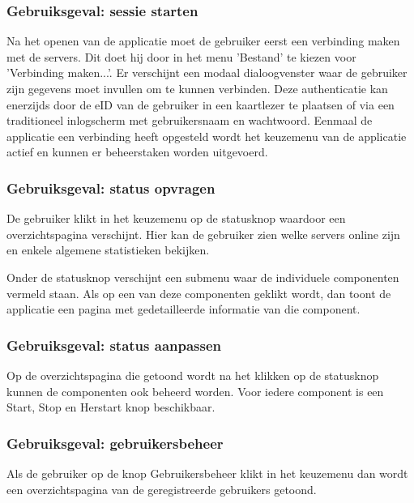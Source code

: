\subsubsection{Gebruiksgeval: sessie starten}
Na het openen van de applicatie moet de gebruiker eerst een verbinding maken met de servers. Dit doet hij door in het menu 'Bestand' te kiezen voor 'Verbinding maken...'. Er verschijnt een modaal dialoogvenster waar de gebruiker zijn gegevens moet invullen om te kunnen verbinden. Deze authenticatie kan enerzijds door de eID van de gebruiker in een kaartlezer te plaatsen of via een traditioneel inlogscherm met gebruikersnaam en wachtwoord. Eenmaal de applicatie een verbinding heeft opgesteld wordt het keuzemenu van de applicatie actief en kunnen er beheerstaken worden uitgevoerd.

\subsubsection{Gebruiksgeval: status opvragen}
De gebruiker klikt in het keuzemenu op de statusknop waardoor een overzichtspagina verschijnt. Hier kan de gebruiker zien welke servers online zijn en enkele algemene statistieken bekijken.

Onder de statusknop verschijnt een submenu waar de individuele componenten vermeld staan. Als op een van deze componenten geklikt wordt, dan toont de applicatie een pagina met gedetailleerde informatie van die component.

\subsubsection{Gebruiksgeval: status aanpassen}
Op de overzichtspagina die getoond wordt na het klikken op de statusknop kunnen de componenten ook beheerd worden. Voor iedere component is een Start, Stop en Herstart knop beschikbaar.

\subsubsection{Gebruiksgeval: gebruikersbeheer}
Als de gebruiker op de knop Gebruikersbeheer klikt in het keuzemenu dan wordt een overzichtspagina van de geregistreerde gebruikers getoond.

